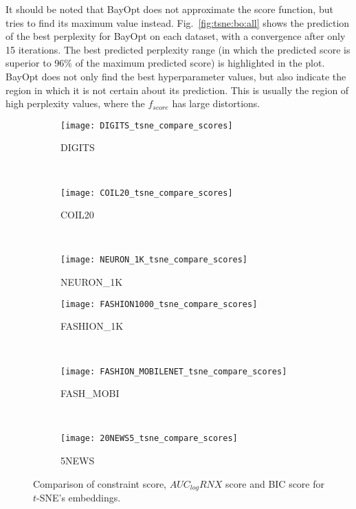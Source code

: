 It should be noted that BayOpt does not approximate the score function, but tries to find its maximum value instead.
Fig.~\ref{fig:tsne:bo:all} shows the prediction of the best perplexity for BayOpt on each dataset, with a convergence after only 15 iterations.
The best predicted perplexity range (in which the predicted score is superior to 96\% of the maximum predicted score) is highlighted in the plot.
BayOpt does not only find the best hyperparameter values, but also indicate the region in which it is not certain about its prediction.
This is usually the region of high perplexity values, where the $f_{score}$ has large distortions.

\begin{figure}%
    \centering
    \begin{subfigure}[b]{0.3\linewidth}
        \centering
        \texttt{[image: DIGITS\_tsne\_compare\_scores]}
        \caption{DIGITS}
    \end{subfigure}
    ~
    \begin{subfigure}[b]{0.3\linewidth}
        \texttt{[image: COIL20\_tsne\_compare\_scores]}
        \caption{COIL20}
    \end{subfigure}
    ~
    \begin{subfigure}[b]{0.3\linewidth}
        \texttt{[image: NEURON\_1K\_tsne\_compare\_scores]}
        \caption{NEURON\_1K}
    \end{subfigure}
    \vfill
    \begin{subfigure}[b]{0.3\linewidth}
        \centering
        \texttt{[image: FASHION1000\_tsne\_compare\_scores]}
        \caption{FASHION\_1K}
    \end{subfigure}
    ~
    \begin{subfigure}[b]{0.3\linewidth}
        \texttt{[image: FASHION\_MOBILENET\_tsne\_compare\_scores]}
        \caption{FASH\_MOBI}
    \end{subfigure}
    ~
    \begin{subfigure}[b]{0.3\linewidth}
        \texttt{[image: 20NEWS5\_tsne\_compare\_scores]}
        \caption{5NEWS}
    \end{subfigure}
    \caption{Comparison of constraint score, $AUC_{log}RNX$ score and BIC score for $t$-SNE's embeddings.}
    \label{fig:tsne:compare}
\end{figure}

